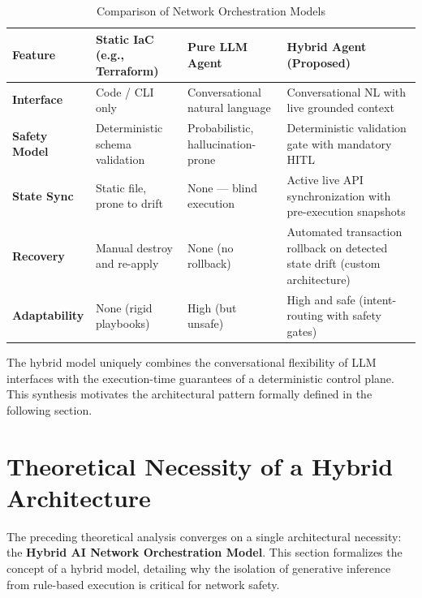 \begin{table}[htbp]
    \small
    \centering
    \renewcommand{\arraystretch}{1.4}
    \begin{tabular}{|p{2.8cm}|p{3.3cm}|p{3.8cm}|p{4.5cm}|}
        \hline
        \textbf{Feature} & \textbf{Static IaC (e.g., Terraform)} & \textbf{Pure LLM Agent} & \textbf{Hybrid Agent (Proposed)} \\
        \hline
        \textbf{Interface} & Code / CLI only & Conversational natural language & Conversational NL with live grounded context \\
        \hline
        \textbf{Safety Model} & Deterministic schema validation & Probabilistic, hallucination-prone~\cite{wang2024netconfeval} & Deterministic validation gate with mandatory HITL~\cite{gomez2024hitl} \\
        \hline
        \textbf{State Sync} & Static file, prone to drift & None --- blind execution & Active live API synchronization with pre-execution snapshots \\
        \hline
        \textbf{Recovery} & Manual destroy and re-apply & None (no rollback) & Automated transaction rollback on detected state drift (custom architecture) \\
        \hline
        \textbf{Adaptability} & None (rigid playbooks) & High (but unsafe) & High and safe (intent-routing with safety gates) \\
        \hline
    \end{tabular}
    \caption{Comparison of Network Orchestration Models}
    \label{tab:orchestration_models}
\end{table}

The hybrid model uniquely combines the conversational flexibility of LLM interfaces with the execution-time guarantees of a deterministic control plane. This synthesis motivates the architectural pattern formally defined in the following section.

\section{Theoretical Necessity of a Hybrid Architecture}
The preceding theoretical analysis converges on a single architectural necessity: the \textbf{Hybrid AI Network Orchestration Model}. This section formalizes the concept of a hybrid model, detailing why the isolation of generative inference from rule-based execution is critical for network safety.

